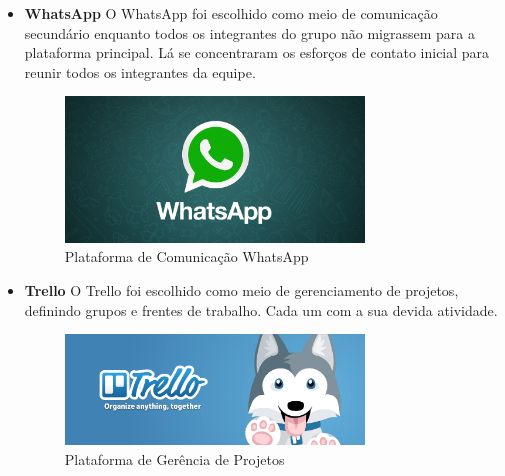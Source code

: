 \begin{itemize}
\item \textbf{WhatsApp}
O WhatsApp foi escolhido como meio de comunicação secundário enquanto todos os integrantes do grupo
não migrassem para a plataforma principal. Lá se concentraram os esforços de contato inicial para reunir
todos os integrantes da equipe.

\begin{figure}[h]
  \centering
  \includegraphics[width=300px, scale=0.5]{figuras/wpp}
  \caption{Plataforma de Comunicação WhatsApp}
  \label{table:wpp}
\end{figure}


\item \textbf{Trello}
O Trello foi escolhido como meio de gerenciamento de projetos, definindo grupos e
frentes de trabalho. Cada um com a sua devida atividade.

\begin{figure}[h]
  \centering
  \includegraphics[width=300px, scale=0.5]{figuras/trello1}
  \caption{Plataforma de Gerência de Projetos}
  \label{table:trello1}
\end{figure}



\end{itemize}
